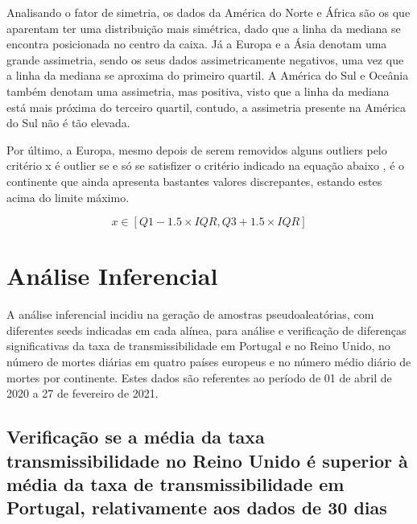 \documentclass[conference]{IEEEtran}
\begin{document}
Analisando o fator de simetria, os dados da América do Norte e África são os que aparentam ter uma distribuição mais simétrica, dado que a linha da mediana se encontra posicionada no centro da caixa. Já a Europa e a Ásia denotam uma grande assimetria, sendo os seus dados assimetricamente negativos, uma vez que a linha da mediana se aproxima do primeiro quartil. A América do Sul e Oceânia também denotam uma assimetria, mas positiva, visto que a linha da mediana está mais próxima do terceiro quartil, contudo, a assimetria presente na América do Sul não é tão elevada.

Por último, a Europa, mesmo depois de serem removidos alguns outliers pelo critério x é outlier se e só se satisfizer o critério indicado na equação abaixo %
, é o continente que ainda apresenta bastantes valores discrepantes, estando estes acima do limite máximo.

\begin{equation}
x\in [Q1-1.5\times IQR, Q3+1.5\times IQR]\label{eq}
\end{equation}



\section{Análise Inferencial} %
A análise inferencial incidiu na geração de amostras pseudoaleatórias, com diferentes seeds indicadas em cada alínea, para análise e verificação de diferenças significativas da taxa de transmissibilidade em Portugal e no Reino Unido, no número de mortes diárias em quatro países europeus e no número médio diário de mortes por continente. Estes dados são referentes ao período de 01 de abril de 2020 a 27 de fevereiro de 2021.

\subsection{Verificação se a média da taxa transmissibilidade no Reino Unido é superior à média da taxa de transmissibilidade em Portugal, relativamente aos dados de 30 dias}
\end{document}
